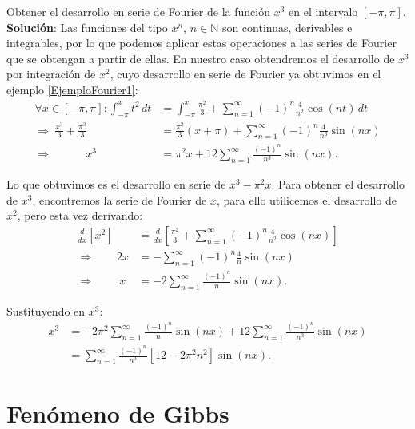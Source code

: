 \begin{ejemplo}
Obtener el desarrollo en serie de Fourier de la función $x^3$ en el intervalo $[-\pi,\pi]$.
\\

\textbf{Solución}: Las funciones del tipo $x^n$, $n \in \mathbb{N}$ son continuas, derivables e integrables, por lo que podemos aplicar estas operaciones a las series de Fourier que se obtengan a partir de ellas.  En nuestro caso obtendremos el desarrollo de $x^3$ por integración de $x^2$, cuyo desarrollo en serie de Fourier ya obtuvimos en el ejemplo \ref{EjemploFourier1}:
\begin{align*}
   \forall x \in [-\pi,\pi]:  \int_{-\pi}^x t^2 \,dt &=   \int_{-\pi}^x   \frac{\pi^2}{3} + \sum_{n=1}^{\infty} (-1)^n \frac{4}{n^2} \cos(nt) \,dt\\
    \Rightarrow ~ \frac{x^3}{3} + \frac{\pi^3}{3} &=  \frac{\pi^2}{3} (x+\pi) + \sum_{n=1}^{\infty} (-1)^n \frac{4 }{n^3}  \sin(nx)  \\
\Rightarrow \qquad \quad    x^3 &= \pi^2 x + 12 \sum_{n=1}^{\infty} \frac{(-1)^n}{n^3} \sin(nx).
\end{align*}

Lo que obtuvimos es el desarrollo en serie de $x^3-\pi^2 x$. Para obtener el desarrollo de $x^3$, encontremos la serie de Fourier de $x$, para ello utilicemos el desarrollo de $x^2$, pero esta vez derivando:
\begin{align*}
    \frac{d}{dx} [x^2] &= \frac{d}{dx} \left[  \frac{\pi^2}{3} + \sum_{n=1}^{\infty} (-1)^n \frac{4}{n^2} \cos(nx)\right] \\
   \Rightarrow \qquad 2x &= - \sum_{n=1}^{\infty} (-1)^n \frac{4}{n} \sin(nx) \\
   \Rightarrow \qquad ~ x &= - 2 \sum_{n=1}^{\infty}  \frac{(-1)^n}{n} \sin(nx).
\end{align*}

Sustituyendo en $x^3$:
\begin{align*}
    x^3 &= -2 \pi^2 \sum_{n=1}^{\infty}  \frac{(-1)^n}{n} \sin(nx) + 12 \sum_{n=1}^{\infty} \frac{(-1)^n}{n^3} \sin(nx) \\
    &= \sum_{n=1}^{\infty} \frac{(-1)^n}{n^3} \left[ 12 - 2\pi^2 n^2 \right] \sin(nx).
\end{align*}
\end{ejemplo}

\section{Fenómeno de Gibbs}

